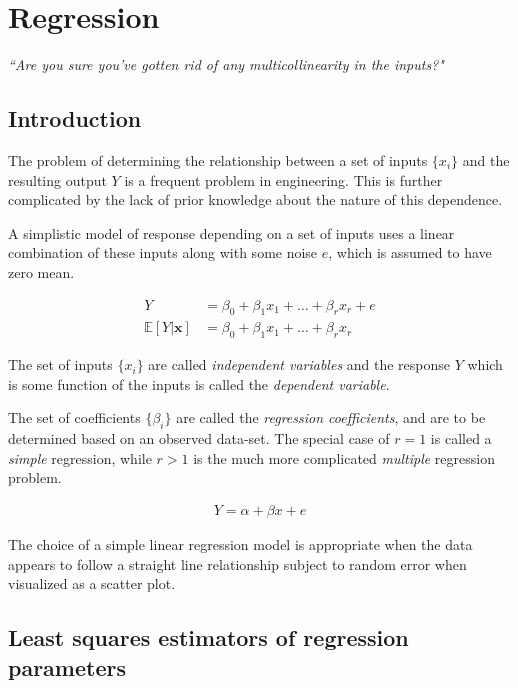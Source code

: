\chapter{Regression}


\begin{flushright}
	\textit{``Are you sure you've gotten rid of any multicollinearity in the inputs?"}
\end{flushright}

\section{Introduction}

The problem of determining the relationship between a set of inputs $ \{x_i\} $ and the resulting output $ Y $ is a frequent problem in engineering. This is further complicated by the lack of prior knowledge about the nature of this dependence.

A simplistic model of response depending on a set of inputs uses a linear combination of these inputs along with some noise $ e $, which is assumed to have zero mean.

\begin{align}
	Y &= \beta_0 + \beta_1 x_1 + \dots + \beta_r x_r + e\\
	\mathbb{E}[Y|\textbf{x}] &= \beta_0 + \beta_1 x_1 + \dots + \beta_r x_r	
\end{align}

The set of inputs $ \{x_i\} $ are called \textit{independent variables} and the response $ Y $ which is some function of the inputs is called the \textit{dependent variable}.

The set of coefficients $ \{\beta_i\} $ are called the \textit{regression coefficients}, and are to be determined based on an observed data-set. The special case of $ r = 1 $ is called a \textit{simple} regression, while $ r > 1 $ is the much more complicated \textit{multiple} regression problem.

\begin{align}
	Y = \alpha + \beta x + e
\end{align}

The choice of a simple linear regression model is appropriate when the data appears to follow a straight line relationship subject to random error when visualized as a scatter plot.

\section{Least squares estimators of regression parameters}

